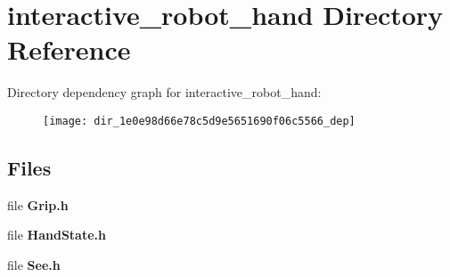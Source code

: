 \section{interactive\-\_\-robot\-\_\-hand Directory Reference}
\label{dir_1e0e98d66e78c5d9e5651690f06c5566}
Directory dependency graph for interactive\-\_\-robot\-\_\-hand\-:
\nopagebreak
\begin{figure}[H]
\begin{center}
\leavevmode
\texttt{[image: dir\_1e0e98d66e78c5d9e5651690f06c5566\_dep]}
\end{center}
\end{figure}
\subsection*{Files}
\begin{DoxyCompactItemize}
\item 
file {\bf Grip.\-h}
\item 
file {\bf Hand\-State.\-h}
\item 
file {\bf See.\-h}
\end{DoxyCompactItemize}
